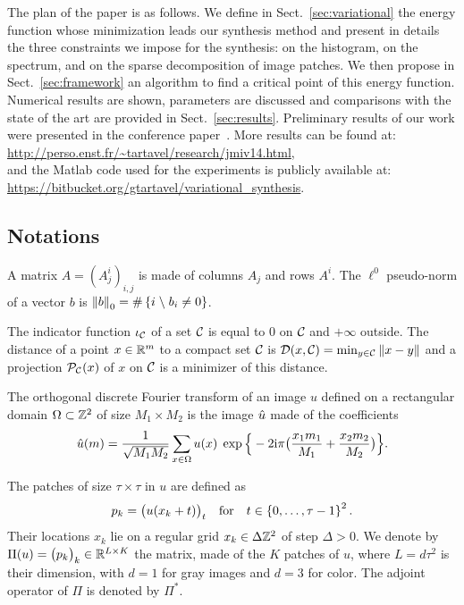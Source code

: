 The plan of the paper is as follows.
We define in Sect.~\ref{sec:variational} the energy function whose minimization leads our synthesis method and present in details the three constraints we impose for the synthesis:  on the histogram, on the spectrum, and on the sparse decomposition of image patches.
We then propose in Sect.~\ref{sec:framework} an algorithm to find a critical point of this energy function.
Numerical results are shown, parameters are discussed and comparisons with the state of the art are provided in Sect.~\ref{sec:results}.
Preliminary results of our work were presented in the conference paper~\cite{tartavel2013constrained}.
More results can be found at: \\
  {\small\url{http://perso.enst.fr/~tartavel/research/jmiv14.html}}, \\
and the Matlab code used for the experiments is publicly available at: \\
  {\small\url{https://bitbucket.org/gtartavel/variational_synthesis}}.



\subsection{Notations}
\label{sub:notations}

A matrix $A=(A_j^i)_{i,j}$ is made of columns $A_j$ and rows $A^i$.
The $\ell^0$ pseudo-norm of a vector $b$ is $\left\|b\right\|_0 = \#\left\{i\mathrel{}\middle\backslash\mathrel{} b_i\neq 0\right\}$.

The indicator function $\iota_{{\mathcal{C}_{\mathrm{}}}}$ of a set ${\mathcal{C}_{\mathrm{}}}$ is equal to $0$ on ${\mathcal{C}_{\mathrm{}}}$ and $+\infty$ outside.
The distance of a point $x\in\mathbb{R}^m$ to a compact set ${\mathcal{C}_{\mathrm{}}}$ is $\mathcal{D}(x,{\mathcal{C}_{\mathrm{}}}) = \min_{y\in{\mathcal{C}_{\mathrm{}}}} \left\|x-y\right\|$ and a projection $\mathcal{P}_{\mathcal{C}_{\mathrm{}}}(x)$ of $x$ on ${\mathcal{C}_{\mathrm{}}}$ is a minimizer of this distance.

The orthogonal discrete Fourier transform of an image $u$ defined on a rectangular domain $\Omega\subset\mathbb{Z}^2$ of size $M_1\times M_2$ is the image $\hat{u}$ made of the coefficients
\begin{equation}
  \label{eq:dft}
  \hat{u}(m) = \frac{1}{\sqrt{M_1 M_2}} \sum_{x\in\Omega} u(x) \;
    \exp\Big\{ -2\mathrm{i}\pi \big(\frac{x_1 m_1}{M_1} + \frac{x_2 m_2}{M_2}\big) \Big\}.
\end{equation}

The patches of size $\tau\times\tau$ in $u$ are defined as
\begin{equation}
  p_k = \big( u(x_k+t) \big)_t
    \quad\text{for}\quad
  t\in\left\{0,\dots,\tau-1\right\}^2.
\end{equation}
Their locations $x_k$ lie on a regular grid $x_k\in\Delta\mathbb{Z}^2$ of step $\Delta>0$.
We denote by $\Pi(u) = \big(p_k\big)_k \in\mathbb{R}^{L\times K}$ the matrix, made of the $K$ patches of $u$, where $L=d\tau^2$ is their dimension, with $d=1$ for gray images and $d=3$ for color.
The adjoint operator of $\Pi$ is denoted by $\Pi^*$.

